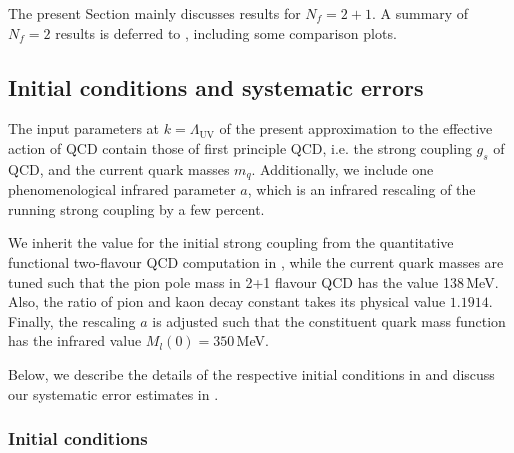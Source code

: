 \documentclass[aps,twocolumn,prd,superscriptaddress]{revtex4-2}
\begin{document}
The present Section mainly discusses results for $N_f = 2+1$. A summary of $N_f=2$ results is deferred to , including some comparison plots. 


\subsection{Initial conditions and systematic errors}
\label{sec:initialSetup} 

The input parameters at $k=\Lambda_\textrm{UV}$ of the present approximation to the effective action of QCD contain those of first principle QCD, i.e. the strong coupling $g_s$ of QCD, and the current quark masses $m_q$. Additionally, we include one phenomenological infrared parameter $a$, which is an infrared rescaling of the running strong coupling by a few percent.

We inherit the value for the initial strong coupling from the quantitative functional two-flavour QCD computation in \cite{Cyrol:2017ewj}, while the current quark masses are tuned such that the pion pole mass in 2+1 flavour QCD has the value 138\,MeV. Also, the ratio of pion and kaon decay constant takes its physical value $1.1914$. Finally, the rescaling $a$ is adjusted such that the constituent quark mass function has the infrared value $M_l(0)=350$\,MeV.

Below, we describe the details of the respective initial conditions in  and discuss our systematic error estimates in . 


\subsubsection{Initial conditions}
\label{sec:InitialConditions}
\end{document}
